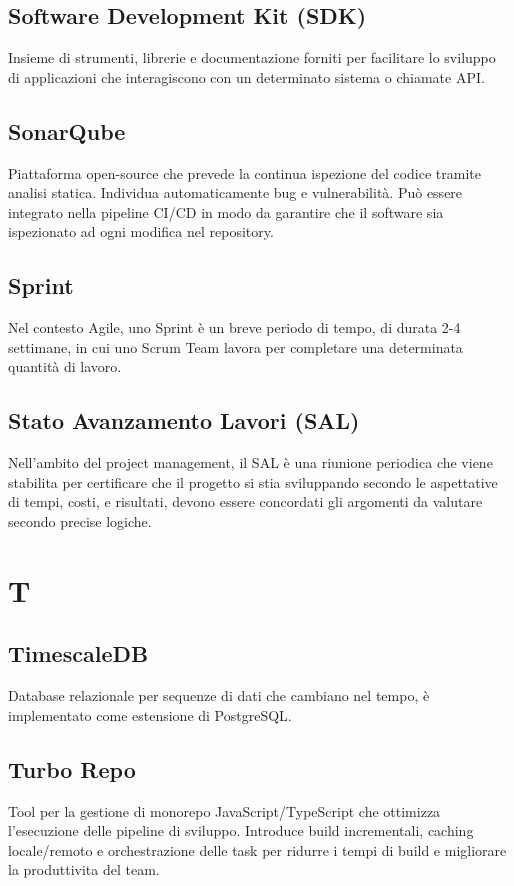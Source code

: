 \documentclass[10pt, letterpaper]{article}
\begin{document}
\subsection*{Software Development Kit (SDK)}
Insieme di strumenti, librerie e documentazione forniti per facilitare lo sviluppo di applicazioni che interagiscono con un determinato sistema o chiamate API.

\subsection*{SonarQube}
Piattaforma open-source che prevede la continua ispezione del codice tramite analisi statica. Individua automaticamente bug e vulnerabilità. Può essere integrato nella pipeline CI/CD in modo da garantire che il software sia ispezionato ad ogni modifica nel repository.

\subsection*{Sprint}
Nel contesto Agile, uno Sprint è un breve periodo di tempo, di durata 2-4 settimane, in cui uno Scrum Team lavora per completare una determinata quantità di
lavoro.

\subsection*{Stato Avanzamento Lavori (SAL)}
Nell'ambito del project management, il SAL è una riunione periodica che viene stabilita per certificare che il progetto si stia sviluppando secondo le
aspettative di tempi, costi, e risultati, devono essere concordati gli argomenti da valutare secondo precise logiche.

\section{T}

\subsection*{TimescaleDB}
Database relazionale per sequenze di dati che cambiano nel tempo, è implementato come estensione di PostgreSQL.

\subsection*{Turbo Repo}
Tool per la gestione di monorepo JavaScript/TypeScript che ottimizza l'esecuzione delle pipeline di sviluppo. Introduce build incrementali, caching locale/remoto e orchestrazione delle task per ridurre i tempi di build e migliorare la produttivita del team.
\end{document}
